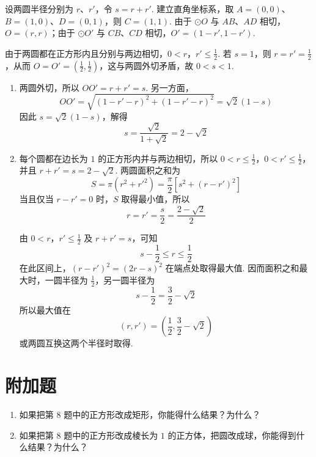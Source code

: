 \documentclass[UTF8,a4paper,oneside,11pt]{ctexbook}
\begin{document}
\begin{solution}
设两圆半径分别为 \(r\)、\(r'\)，令 \(s=r+r'\). 建立直角坐标系，取 \(A=(0,0)\)、\(B=(1,0)\)、\(D=(0,1)\)，则 \(C=(1,1)\). 由于 \(\odot O\) 与 \(AB\)、\(AD\) 相切，\(O=(r,r)\)；由于 \(\odot O'\) 与 \(CB\)、\(CD\) 相切，\(O'=(1-r',1-r')\).


由于两圆都在正方形内且分别与两边相切，\(0<r\)，\(r'\le\frac12\). 若 \(s=1\)，则 \(r=r'=\frac12\)，从而 \(O=O'=\left(\frac12,\frac12\right)\)，这与两圆外切矛盾，故 \(0<s<1\).

\begin{enumerate}
\item 两圆外切，所以 \(OO'=r+r'=s\). 另一方面，
\[
OO'=\sqrt{\left( 1-r'-r \right)^2+\left( 1-r'-r \right)^2}=\sqrt2\left( 1-s \right)
\]
因此 \(s=\sqrt2\left( 1-s \right)\)，解得
\[
s=\frac{\sqrt2}{1+\sqrt2}=2-\sqrt2
\]

\item 每个圆都在边长为 \(1\) 的正方形内并与两边相切，所以 \(0<r\le\frac12\)，\(0<r'\le\frac12\)，并且 \(r+r'=s=2-\sqrt2\).
两圆面积之和为
\[
S=\pi\left( r^2+r'^2 \right)=\frac{\pi}{2}\left[ s^2+\left( r-r' \right)^2 \right]
\]
当且仅当 \(r-r'=0\) 时，\(S\) 取得最小值，所以
\[
r=r'=\frac{s}{2}=\frac{2-\sqrt2}{2}
\]

由 \(0<r\)，\(r'\le\frac12\) 及 \(r+r'=s\)，可知
\[
s-\frac12\le r\le\frac12
\]
在此区间上，\(\left( r-r' \right)^2=\left( 2r-s \right)^2\) 在端点处取得最大值. 因而面积之和最大时，一圆半径为 \(\frac12\)，另一圆半径为
\[
s-\frac12=\frac32-\sqrt2
\]
所以最大值在
\[
\left( r,r' \right)=\left( \frac12,\frac32-\sqrt2 \right)
\]
或两圆互换这两个半径时取得.
\end{enumerate}
\end{solution}

\section{附加题}

\begin{problem}
\begin{enumerate}
\item 如果把第 \(8\) 题中的正方形改成矩形，你能得什么结果？为什么？

\item 如果把第 \(8\) 题中的正方形改成棱长为 \(1\) 的正方体，把圆改成球，你能得到什么结果？为什么？
\end{enumerate}
\end{problem}
\end{document}
